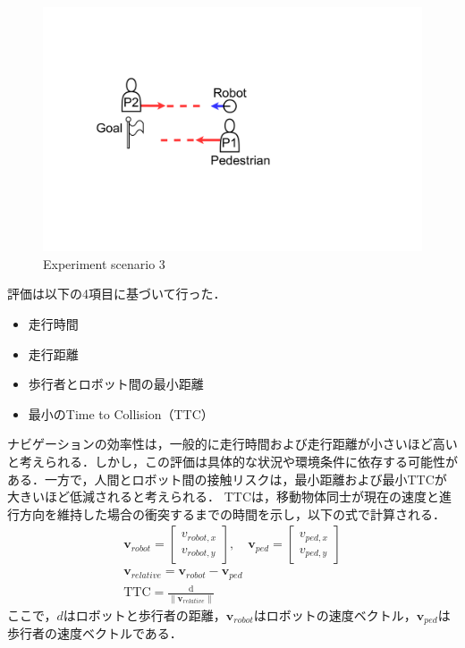 \begin{figure}[H]
  \centering
  \includegraphics[keepaspectratio, scale=0.15]{images/scenario3.pdf}
  \caption{Experiment scenario 3}
  \label{Fig:scenario3}
\end{figure}


評価は以下の4項目に基づいて行った．
\begin{itemize}
  \item 走行時間
  \item 走行距離
  \item 歩行者とロボット間の最小距離
  \item 最小のTime to Collision（TTC）
\end{itemize}

ナビゲーションの効率性は，一般的に走行時間および走行距離が小さいほど高いと考えられる．しかし，この評価は具体的な状況や環境条件に依存する可能性がある．一方で，人間とロボット間の接触リスクは，最小距離および最小TTCが大きいほど低減されると考えられる．
TTCは，移動物体同士が現在の速度と進行方向を維持した場合の衝突するまでの時間を示し，以下の式で計算される．
\setlength{\jot}{1em}
\begin{align}
  \mathbf{v}_{robot} = \begin{bmatrix} v_{robot,x} \\ v_{robot,y} \end{bmatrix}, \quad 
  \mathbf{v}_{ped} = \begin{bmatrix} v_{ped,x} \\ v_{ped,y} \end{bmatrix} \\
  \mathbf{v}_{relative} = \mathbf{v}_{robot} - \mathbf{v}_{ped} \\
  \text{TTC} = \frac{\text{d}}{\|\mathbf{v}_{relative}\|}
\end{align}
ここで，$d$はロボットと歩行者の距離，$\mathbf{v}_{robot}$はロボットの速度ベクトル，$\mathbf{v}_{ped}$は歩行者の速度ベクトルである．

